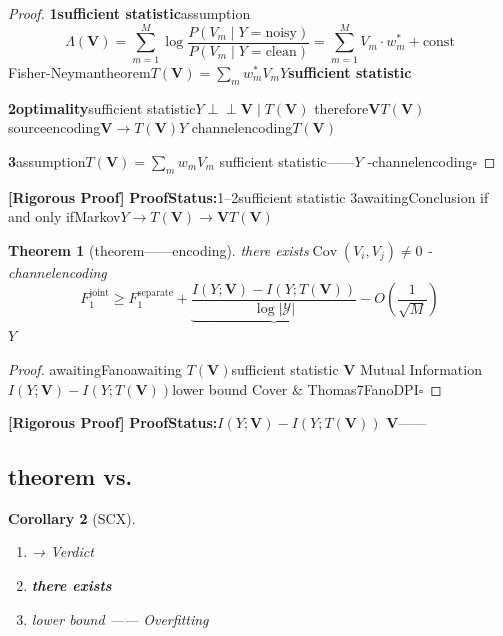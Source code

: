 \documentclass[11pt,a4paper]{article}
\newtheorem{theorem}{Theorem}[section]
\newtheorem{corollary}[theorem]{Corollary}
\theoremstyle{remark}
\DeclareMathOperator{\Cov}{Cov}
\newcommand{\Y}{\mathcal{Y}}
\newcommand{\indep}{\perp\!\!\!\perp}
\newcommand{\rigorous}{\textnormal{\textbf{[Rigorous Proof]}}}
\begin{document}
\begin{proof}
\textbf{1sufficient statistic}assumption
\begin{equation}
    \Lambda(\mathbf{V}) = \sum_{m=1}^{M} \log\frac{P(V_m \mid Y = \text{noisy})}{P(V_m \mid Y = \text{clean})}
    = \sum_{m=1}^{M} V_m \cdot w_m^* + \text{const}
\end{equation}
Fisher-Neymantheorem$T(\mathbf{V}) = \sum_m w_m^* V_m$$Y$\textbf{sufficient statistic}

\textbf{2optimality}sufficient statistic$Y \indep \mathbf{V} \mid T(\mathbf{V})$
therefore$\mathbf{V}$$T(\mathbf{V})$
sourceencoding$\mathbf{V} \to T(\mathbf{V})$$Y$
channelencoding$T(\mathbf{V})$

\textbf{3}assumption$T(\mathbf{V}) = \sum_m w_m V_m$
sufficient statistic——$Y$
\textbf{}-channelencoding\hfill $\square$
\end{proof}

\rigorous{} \textbf{ProofStatus:}1--2sufficient statistic
3awaitingConclusion
if and only ifMarkov$Y \to T(\mathbf{V}) \to \mathbf{V}$$T(\mathbf{V})$

\begin{theorem}[theorem——encoding]
\label{thm:separation_failure}
there exists$\Cov(V_i, V_j) \neq 0$
-channelencoding
\begin{equation}
    \boxed{F_{1}^{\text{joint}} \geq F_{1}^{\text{separate}}
    + \underbrace{\frac{I(Y; \mathbf{V}) - I(Y; T(\mathbf{V}))}{\log |\Y|}}_{\text{}}
    - O\!\left(\frac{1}{\sqrt{M}}\right)}
\end{equation}
$Y$
\end{theorem}

\begin{proof}
awaitingFanoawaiting
$T(\mathbf{V})$sufficient statistic
$\mathbf{V}$
Mutual Information$I(Y; \mathbf{V}) - I(Y; T(\mathbf{V}))$lower bound
Cover \& Thomas\cite{cover2006}7FanoDPI\hfill $\square$
\end{proof}

\rigorous{} \textbf{ProofStatus:}$I(Y; \mathbf{V}) - I(Y; T(\mathbf{V}))$
$\mathbf{V}$——

\subsection{theorem vs.\ }

\begin{corollary}[SCX]
\label{cor:architecture}
\begin{enumerate}[label=(\arabic*)]
    \item \textbf{}
           → Verdict\textbf{}
    \item \textbf{there exists}
          \textbf{}
    \item \textbf{}lower bound
          ——
          Overfitting
\end{enumerate}
\end{corollary}
\end{document}
